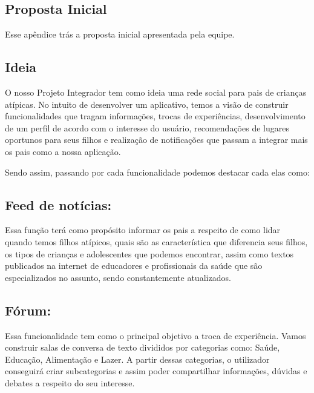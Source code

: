 
\begin{apendicesenv}
	
	\partapendices
	
	\chapter{Proposta Inicial}
	
	Esse apêndice trás a proposta inicial apresentada pela equipe. 
	
	\section{Ideia}
	
	O nosso Projeto Integrador tem como ideia uma rede social para pais de crianças atípicas. No intuito de desenvolver um aplicativo, temos a visão de construir funcionalidades que tragam informações, trocas de experiências, desenvolvimento de um perfil de acordo com o interesse do usuário, recomendações de lugares oportunos para seus filhos e realização de notificações que passam a integrar mais os pais como a nossa aplicação. 
	
	Sendo assim, passando por cada funcionalidade podemos destacar cada elas como: 
	
	
	
	
	
	\section{Feed de notícias:}
	Essa função terá como propósito informar os pais a respeito de como lidar quando temos filhos atípicos, quais são as característica que diferencia seus filhos, os tipos de crianças e adolescentes que podemos encontrar, assim como textos publicados na internet de educadores e profissionais da saúde que são especializados no assunto, sendo constantemente atualizados. 
	
	\section{Fórum:}
	Essa funcionalidade tem como o principal objetivo a troca de experiência. Vamos construir salas de conversa de texto divididos por categorias como: Saúde, Educação, Alimentação e Lazer. A partir dessas categorias, o utilizador conseguirá criar subcategorias e assim poder compartilhar informações, dúvidas e debates a respeito do seu interesse.
	

\end{apendicesenv}
